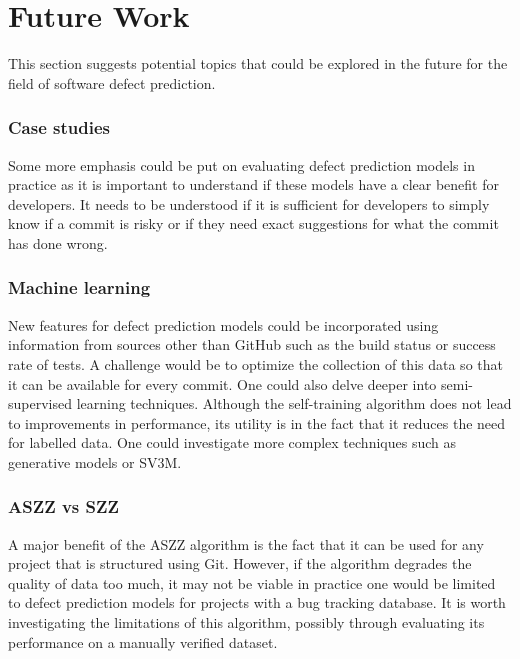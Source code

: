 \documentclass[../main.tex]{subfiles}
\begin{document}
\section{Future Work}

This section suggests potential topics that could be explored in the future for the field of software defect prediction. 

\subsubsection{Case studies}

Some more emphasis could be put on evaluating defect prediction models in practice as it is important to understand if these models have a clear benefit for developers. It needs to be understood if it is sufficient for developers to simply know if a commit is risky or if they need exact suggestions for what the commit has done wrong.

\subsubsection{Machine learning}

New features for defect prediction models could be incorporated using information from sources other than GitHub such as the build status or success rate of tests. A challenge would be to optimize the collection of this data so that it can be available for every commit. One could also delve deeper into semi-supervised learning techniques. Although the self-training algorithm does not lead to improvements in performance, its utility is in the fact that it reduces the need for labelled data. One could investigate more complex techniques such as generative models or SV3M. 

\subsubsection{ASZZ vs SZZ}

A major benefit of the ASZZ algorithm is the fact that it can be used for any project that is structured using Git. However, if the algorithm degrades the quality of data too much, it may not be viable in practice one would be limited to defect prediction models for projects with a bug tracking database. It is worth investigating the limitations of this algorithm, possibly through evaluating its performance on a manually verified dataset. 
\end{document}
